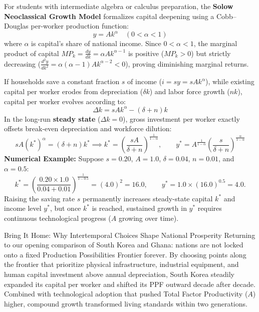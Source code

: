 \documentclass[11pt,letterpaper]{article}
\begin{document}
\begin{casestudy}
For students with intermediate algebra or calculus preparation, the \textbf{Solow Neoclassical Growth Model} formalizes capital deepening using a Cobb--Douglas per-worker production function:
$$y = A k^{\alpha} \quad (0 < \alpha < 1)$$
where $\alpha$ is capital's share of national income. Since $0 < \alpha < 1$, the marginal product of capital $MP_k = \frac{dy}{dk} = \alpha A k^{\alpha - 1}$ is positive ($MP_k > 0$) but strictly decreasing ($\frac{d^2 y}{dk^2} = \alpha(\alpha - 1)A k^{\alpha - 2} < 0$), proving diminishing marginal returns.

If households save a constant fraction $s$ of income ($i = s y = s A k^\alpha$), while existing capital per worker erodes from depreciation ($\delta k$) and labor force growth ($n k$), capital per worker evolves according to:
$$\Delta k = s A k^{\alpha} - (\delta + n)k$$
In the long-run \textbf{steady state} ($\Delta k = 0$), gross investment per worker exactly offsets break-even depreciation and workforce dilution:
$$s A (k^*)^{\alpha} = (\delta + n)k^* \implies k^* = \left(\frac{s A}{\delta + n}\right)^{\frac{1}{1 - \alpha}}, \qquad y^* = A^{\frac{1}{1 - \alpha}}\left(\frac{s}{\delta + n}\right)^{\frac{\alpha}{1 - \alpha}}$$
\textbf{Numerical Example:} Suppose $s = 0.20$, $A = 1.0$, $\delta = 0.04$, $n = 0.01$, and $\alpha = 0.5$:
$$k^* = \left(\frac{0.20 \times 1.0}{0.04 + 0.01}\right)^{\frac{1}{1 - 0.5}} = (4.0)^2 = 16.0, \qquad y^* = 1.0 \times (16.0)^{0.5} = 4.0.$$
Raising the saving rate $s$ permanently increases steady-state capital $k^*$ and income level $y^*$, but once $k^*$ is reached, sustained growth in $y^*$ requires continuous technological progress ($A$ growing over time).
\end{casestudy}

\begin{examplecase}{Bring It Home: Why Intertemporal Choices Shape National Prosperity}
Returning to our opening comparison of South Korea and Ghana: nations are not locked onto a fixed Production Possibilities Frontier forever. By choosing points along the frontier that prioritize physical infrastructure, industrial equipment, and human capital investment above annual depreciation, South Korea steadily expanded its capital per worker and shifted its PPF outward decade after decade. Combined with technological adoption that pushed Total Factor Productivity ($A$) higher, compound growth transformed living standards within two generations.
\end{examplecase}
\end{document}
